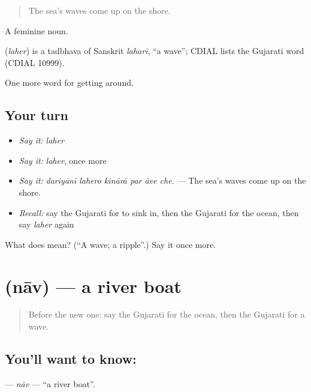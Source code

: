 \begin{quote}
The sea's waves come up on the shore.
\end{quote}

A feminine noun.

\begin{cousinweb}
\textbf{} (\emph{laher}) is a tadbhava of Sanskrit \emph{laharī}, \textquotedblleft{}a wave\textquotedblright{}; CDIAL lists the Gujarati word (CDIAL 10999).
\end{cousinweb}

\begin{grammarlens}[title={What you've built}]
One more word for getting around.
\end{grammarlens}

\subsection*{Your turn}
\begin{itemize}
\raggedright
  \item \emph{Say it:} \emph{laher}
  \item \emph{Say it:} \emph{laher}, once more
  \item \emph{Say it:} \emph{dariyānī lahero kinārā par āve che.} — The sea's waves come up on the shore.
  \item \emph{Recall:} say the Gujarati for to sink in, then the Gujarati for the ocean, then say \emph{laher} again
\end{itemize}

\begin{tcolorbox}[breakable,colback=teal!4,colframe=teal!35!black,title={Before you move on}]
What does  mean? (\textquotedblleft{}A wave; a ripple\textquotedblright{}.) Say it once more.
\end{tcolorbox}
\section[\texorpdfstring{\gu{નાવ} (nāv)}{નાવ (nāv)}]{ (nāv) — a river boat}

\label{lesson:GU-C442-nav}



\begin{quote}
Before the new one: say the Gujarati for the ocean, then the Gujarati for a wave.
\end{quote}

\subsection*{You'll want to know: }
\textbf{} — \emph{nāv} — \textquotedblleft{}a river boat\textquotedblright{}.

